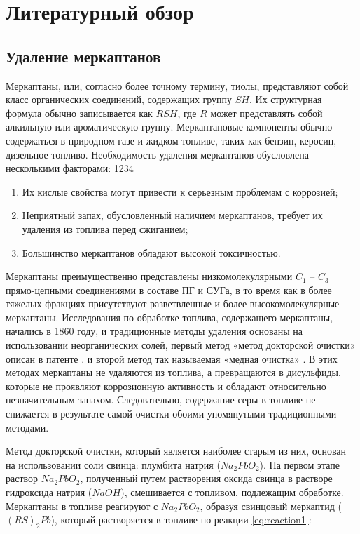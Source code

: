 \chapter{Литературный обзор} \label{ch:ch1}

\section{Удаление меркаптанов} \label{sec:ch1/sec1}

Меркаптаны, или, согласно более точному термину, тиолы, представляют собой класс органических соединений, содержащих группу $SH$. Их структурная формула обычно записывается как $RSH$, где $R$ может представлять собой алкильную или ароматическую группу. Меркаптановые компоненты обычно содержаться в природном газе и жидком топливе, таких как бензин, керосин, дизельное топливо. Необходимость удаления меркаптанов обусловлена несколькими факторами:
	1234
\begin{enumerate}
	\item Их кислые свойства могут привести к серьезным проблемам с коррозией;
	\item Неприятный запах, обусловленный наличием меркаптанов, требует их удаления из топлива перед сжиганием;
	\item Большинство меркаптанов обладают высокой токсичностью.
\end{enumerate}

Меркаптаны преимущественно представлены низкомолекулярными $C _1$ – $C _3$ прямо-цепными соединениями в составе ПГ и СУГа, в то время как в более тяжелых фракциях присутствуют разветвленные и более высокомолекулярные меркаптаны. Исследования по обработке топлива, содержащего меркаптаны, начались в 1860 году, и традиционные методы удаления основаны на использовании неорганических солей, первый метод «метод докторской очистки» описан в патенте \cite{kalinowski_doctor_1959}. и второй метод так называемая «медная очистка» \cite{krause_color_1952}. В этих методах меркаптаны не удаляются из топлива, а превращаются в дисульфиды, которые не проявляют коррозионную активность и обладают относительно незначительным запахом. Следовательно, содержание серы в топливе не снижается в результате самой очистки обоими упомянутыми традиционными методами.

Метод докторской очистки, который является наиболее старым из них, основан на использовании соли свинца: плумбита натрия ($Na_2PbO_2$). На первом этапе раствор $Na_2PbO_2$, полученный путем растворения оксида свинца в растворе гидроксида натрия ($NaOH$), смешивается с топливом, подлежащим обработке. Меркаптаны в топливе реагируют с $Na_2PbO_2$, образуя свинцовый меркаптид ($(RS)_2Pb$), который растворяется в топливе по реакции \cref{eq:reaction1}:


